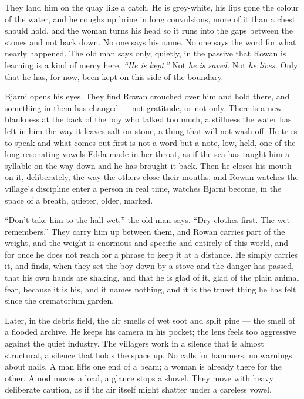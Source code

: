 \documentclass[11pt,oneside]{book}
\newcommand{\sceneline}{%
  \par\vspace{1.2em}
  \begin{center}
    \fontsize{11}{11}\selectfont \textbullet\quad\textbullet\quad\textbullet
  \end{center}
  \vspace{0.6em}\noindent\ignorespaces
}
\begin{document}
They land him on the quay like a catch. He is grey-white, his lips gone
the colour of the water, and he coughs up brine in long convulsions,
more of it than a chest should hold, and the woman turns his head so it
runs into the gaps between the stones and not back down. No one says his
name. No one says the word for what nearly happened. The old man says
only, quietly, in the passive that Rowan is learning is a kind of mercy
here, \emph{``He is kept.''} Not \emph{he is saved.} Not \emph{he
lives.} Only that he has, for now, been kept on this side of the
boundary.

Bjarni opens his eyes. They find Rowan crouched over him and hold there,
and something in them has changed --- not gratitude, or not only. There
is a new blankness at the back of the boy who talked too much, a
stillness the water has left in him the way it leaves salt on stone, a
thing that will not wash off. He tries to speak and what comes out first
is not a word but a note, low, held, one of the long resonating vowels
Edda made in her throat, as if the sea has taught him a syllable on the
way down and he has brought it back. Then he closes his mouth on it,
deliberately, the way the others close their mouths, and Rowan watches
the village's discipline enter a person in real time, watches Bjarni
become, in the space of a breath, quieter, older, marked.

``Don't take him to the hall wet,'' the old man says. ``Dry clothes
first. The wet remembers.'' They carry him up between them, and Rowan
carries part of the weight, and the weight is enormous and specific and
entirely of this world, and for once he does not reach for a phrase to
keep it at a distance. He simply carries it, and finds, when they set
the boy down by a stove and the danger has passed, that his own hands
are shaking, and that he is glad of it, glad of the plain animal fear,
because it is his, and it names nothing, and it is the truest thing he
has felt since the crematorium garden.

\sceneline

Later, in the debris field, the air smells of wet soot and split pine
--- the smell of a flooded archive. He keeps his camera in his pocket;
the lens feels too aggressive against the quiet industry. The villagers
work in a silence that is almost structural, a silence that holds the
space up. No calls for hammers, no warnings about nails. A man lifts one
end of a beam; a woman is already there for the other. A nod moves a
load, a glance stops a shovel. They move with heavy deliberate caution,
as if the air itself might shatter under a careless vowel.
\end{document}
